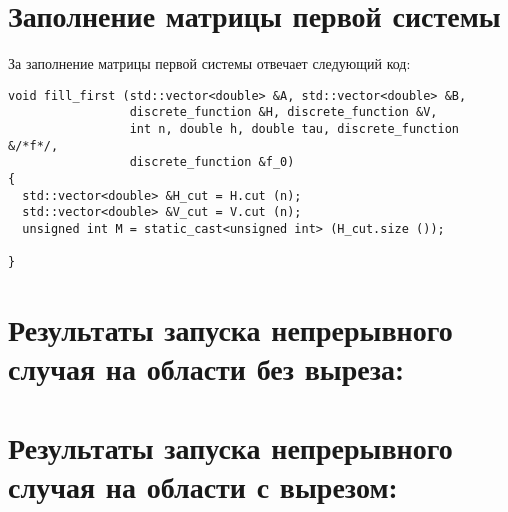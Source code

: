 \documentclass[a4paper,11pt]{article}
\begin{document}
\newpage
\section{Заполнение матрицы первой системы}
За заполнение матрицы первой системы отвечает следующий код:
\begin{verbatim}
void fill_first (std::vector<double> &A, std::vector<double> &B,
                 discrete_function &H, discrete_function &V,
                 int n, double h, double tau, discrete_function &/*f*/,
                 discrete_function &f_0)
{
  std::vector<double> &H_cut = H.cut (n);
  std::vector<double> &V_cut = V.cut (n);
  unsigned int M = static_cast<unsigned int> (H_cut.size ());

}
\end{verbatim}

\newpage
\section{Результаты запуска непрерывного случая на области без выреза:}

\newpage
\section{Результаты запуска непрерывного случая на области с вырезом:}
\end{document}
